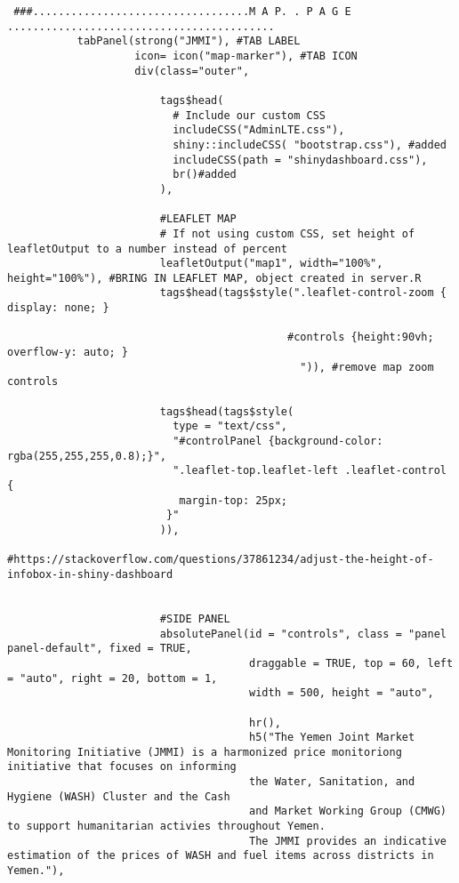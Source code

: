 \documentclass[
]{article}
\begin{document}
\begin{verbatim}
 ###..................................M A P. . P A G E ..........................................
           tabPanel(strong("JMMI"), #TAB LABEL
                    icon= icon("map-marker"), #TAB ICON
                    div(class="outer",
                        
                        tags$head(
                          # Include our custom CSS
                          includeCSS("AdminLTE.css"),
                          shiny::includeCSS( "bootstrap.css"), #added 
                          includeCSS(path = "shinydashboard.css"),
                          br()#added
                        ),
                        
                        #LEAFLET MAP
                        # If not using custom CSS, set height of leafletOutput to a number instead of percent
                        leafletOutput("map1", width="100%", height="100%"), #BRING IN LEAFLET MAP, object created in server.R
                        tags$head(tags$style(".leaflet-control-zoom { display: none; }
                                              
                                            #controls {height:90vh; overflow-y: auto; }
                                              ")), #remove map zoom controls
                      
                        tags$head(tags$style(
                          type = "text/css",
                          "#controlPanel {background-color: rgba(255,255,255,0.8);}",
                          ".leaflet-top.leaflet-left .leaflet-control {
                           margin-top: 25px;
                         }"
                        )),
                        #https://stackoverflow.com/questions/37861234/adjust-the-height-of-infobox-in-shiny-dashboard
                        
                       
                        #SIDE PANEL
                        absolutePanel(id = "controls", class = "panel panel-default", fixed = TRUE,
                                      draggable = TRUE, top = 60, left = "auto", right = 20, bottom = 1,
                                      width = 500, height = "auto", 
                                      
                                      hr(),
                                      h5("The Yemen Joint Market Monitoring Initiative (JMMI) is a harmonized price monitoriong initiative that focuses on informing
                                      the Water, Sanitation, and Hygiene (WASH) Cluster and the Cash 
                                      and Market Working Group (CMWG) to support humanitarian activies throughout Yemen.  
                                      The JMMI provides an indicative estimation of the prices of WASH and fuel items across districts in Yemen."),
                                      

\end{verbatim}
\end{document}
